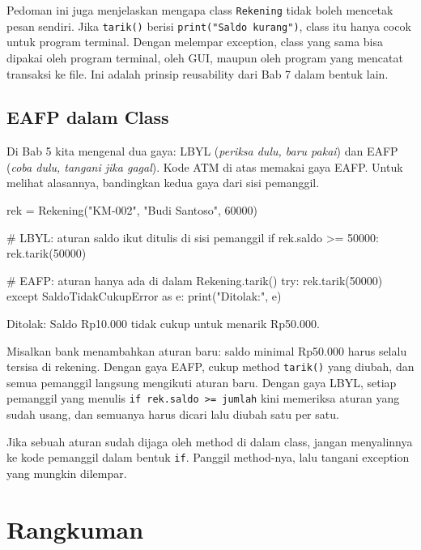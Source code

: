 Pedoman ini juga menjelaskan mengapa class \texttt{Rekening} tidak boleh mencetak pesan sendiri. Jika \texttt{tarik()} berisi \texttt{print("Saldo kurang")}, class itu hanya cocok untuk program terminal. Dengan melempar exception, class yang sama bisa dipakai oleh program terminal, oleh GUI, maupun oleh program yang mencatat transaksi ke file. Ini adalah prinsip reusability dari Bab 7 dalam bentuk lain.

\subsection{EAFP dalam Class}

Di Bab 5 kita mengenal dua gaya: LBYL (\emph{periksa dulu, baru pakai}) dan EAFP (\emph{coba dulu, tangani jika gagal}). Kode ATM di atas memakai gaya EAFP. Untuk melihat alasannya, bandingkan kedua gaya dari sisi pemanggil.

\begin{kode}
rek = Rekening("KM-002", "Budi Santoso", 60000)

# LBYL: aturan saldo ikut ditulis di sisi pemanggil
if rek.saldo >= 50000:
    rek.tarik(50000)

# EAFP: aturan hanya ada di dalam Rekening.tarik()
try:
    rek.tarik(50000)
except SaldoTidakCukupError as e:
    print("Ditolak:", e)
\end{kode}

\begin{keluaran}
Ditolak: Saldo Rp10.000 tidak cukup untuk menarik Rp50.000.
\end{keluaran}

Misalkan bank menambahkan aturan baru: saldo minimal Rp50.000 harus selalu tersisa di rekening. Dengan gaya EAFP, cukup method \texttt{tarik()} yang diubah, dan semua pemanggil langsung mengikuti aturan baru. Dengan gaya LBYL, setiap pemanggil yang menulis \texttt{if rek.saldo >= jumlah} kini memeriksa aturan yang sudah usang, dan semuanya harus dicari lalu diubah satu per satu.

\begin{tips}
Jika sebuah aturan sudah dijaga oleh method di dalam class, jangan menyalinnya ke kode pemanggil dalam bentuk \texttt{if}. Panggil method-nya, lalu tangani exception yang mungkin dilempar.
\end{tips}

\section{Rangkuman}

